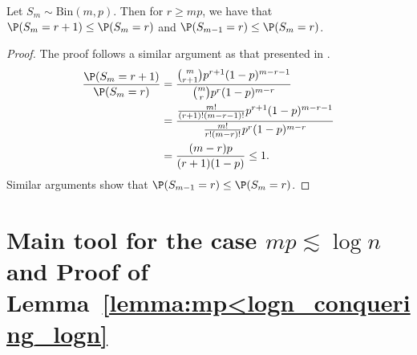 \begin{lemma}  \label{lemma:binomial_monotonicity}
Let $S_m \sim \mathrm{Bin}(m, p)$. Then for $r \geq mp$, we have that $\P(S_m = r + 1) \leq \P(S_m = r)$ and \(\P(S_{m-1} = r) \leq \P(S_{m} = r)\).
\end{lemma}
%
\begin{proof}
The proof follows a similar argument as that presented in \cite{bunke_feller_1969}.  
\begin{align*}
\frac{\P(S_m = r + 1)}{\P(S_m = r)} &= \frac{ {m \choose r+1} p^{r+1} (1 - p)^{m - r - 1} }{ {m \choose r} p^r (1 - p)^{m - r} } \\
&= \frac{ \frac{m!}{(r + 1)! (m - r - 1)!} p^{r + 1} (1-p)^{m - r - 1}}{ \frac{m!}{r! (m - r)!} p^r (1-p)^{m - r}} \\
&= \frac{(m - r) p }{(r + 1) (1-p)} \leq 1. 
\end{align*}
Similar arguments show that \(\P(S_{m-1} = r) \leq \P(S_{m} = r)\).
\end{proof}

\section{Main tool for the case \(mp \lesssim \log n\) and Proof of Lemma~\ref{lemma:mp<logn_conquering_logn}}\label{app:geom_alg}

